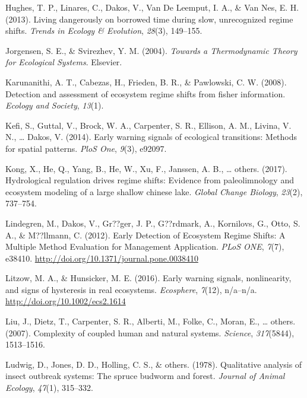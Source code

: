 \documentclass[12pt,twoside,openany]{reedthesis}
\begin{document}
\hypertarget{ref-hughes_living_2013}{}
Hughes, T. P., Linares, C., Dakos, V., Van De Leemput, I. A., \& Van
Nes, E. H. (2013). Living dangerously on borrowed time during slow,
unrecognized regime shifts. \emph{Trends in Ecology \& Evolution},
\emph{28}(3), 149--155.

\hypertarget{ref-jorgensen_towards_2004}{}
Jorgensen, S. E., \& Svirezhev, Y. M. (2004). \emph{Towards a
Thermodynamic Theory for Ecological Systems}. Elsevier.

\hypertarget{ref-karunanithi_detection_2008}{}
Karunanithi, A. T., Cabezas, H., Frieden, B. R., \& Pawlowski, C. W.
(2008). Detection and assessment of ecosystem regime shifts from fisher
information. \emph{Ecology and Society}, \emph{13}(1).

\hypertarget{ref-kefi2014early}{}
Kefi, S., Guttal, V., Brock, W. A., Carpenter, S. R., Ellison, A. M.,
Livina, V. N., \ldots{} Dakos, V. (2014). Early warning signals of
ecological transitions: Methods for spatial patterns. \emph{PloS One},
\emph{9}(3), e92097.

\hypertarget{ref-kong2017hydrological}{}
Kong, X., He, Q., Yang, B., He, W., Xu, F., Janssen, A. B., \ldots{}
others. (2017). Hydrological regulation drives regime shifts: Evidence
from paleolimnology and ecosystem modeling of a large shallow chinese
lake. \emph{Global Change Biology}, \emph{23}(2), 737--754.

\hypertarget{ref-lindegren_early_2012}{}
Lindegren, M., Dakos, V., Gr??ger, J. P., G??rdmark, A., Kornilovs, G.,
Otto, S. A., \& M??llmann, C. (2012). Early Detection of Ecosystem
Regime Shifts: A Multiple Method Evaluation for Management Application.
\emph{PLoS ONE}, \emph{7}(7), e38410.
\url{http://doi.org/10.1371/journal.pone.0038410}

\hypertarget{ref-litzow_early_2016}{}
Litzow, M. A., \& Hunsicker, M. E. (2016). Early warning signals,
nonlinearity, and signs of hysteresis in real ecosystems.
\emph{Ecosphere}, \emph{7}(12), n/a--n/a.
\url{http://doi.org/10.1002/ecs2.1614}

\hypertarget{ref-liu_complexity_2007}{}
Liu, J., Dietz, T., Carpenter, S. R., Alberti, M., Folke, C., Moran, E.,
\ldots{} others. (2007). Complexity of coupled human and natural
systems. \emph{Science}, \emph{317}(5844), 1513--1516.

\hypertarget{ref-ludwig1978qualitative}{}
Ludwig, D., Jones, D. D., Holling, C. S., \& others. (1978). Qualitative
analysis of insect outbreak systems: The spruce budworm and forest.
\emph{Journal of Animal Ecology}, \emph{47}(1), 315--332.
\end{document}
